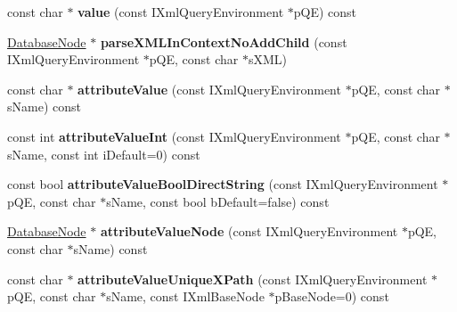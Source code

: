 \begin{DoxyCompactItemize}
\item 
\hypertarget{classgeneral__server_1_1DatabaseNode_a3c3f7f987e9130b0615c0a8320ac7bc9}{const char $\ast$ {\bfseries value} (const \-I\-Xml\-Query\-Environment $\ast$p\-Q\-E) const }\label{classgeneral__server_1_1DatabaseNode_a3c3f7f987e9130b0615c0a8320ac7bc9}

\item 
\hypertarget{classgeneral__server_1_1DatabaseNode_a30fb4e2c3d26b2a14b2abafe7385e47a}{\hyperlink{classgeneral__server_1_1DatabaseNode}{\-Database\-Node} $\ast$ {\bfseries parse\-X\-M\-L\-In\-Context\-No\-Add\-Child} (const \-I\-Xml\-Query\-Environment $\ast$p\-Q\-E, const char $\ast$s\-X\-M\-L)}\label{classgeneral__server_1_1DatabaseNode_a30fb4e2c3d26b2a14b2abafe7385e47a}

\item 
\hypertarget{classgeneral__server_1_1DatabaseNode_a1b46ea1604cb442d056ca617d86dd1e5}{const char $\ast$ {\bfseries attribute\-Value} (const \-I\-Xml\-Query\-Environment $\ast$p\-Q\-E, const char $\ast$s\-Name) const }\label{classgeneral__server_1_1DatabaseNode_a1b46ea1604cb442d056ca617d86dd1e5}

\item 
\hypertarget{classgeneral__server_1_1DatabaseNode_a3ec5946782e737674a8a7c35eb1fa346}{const int {\bfseries attribute\-Value\-Int} (const \-I\-Xml\-Query\-Environment $\ast$p\-Q\-E, const char $\ast$s\-Name, const int i\-Default=0) const }\label{classgeneral__server_1_1DatabaseNode_a3ec5946782e737674a8a7c35eb1fa346}

\item 
\hypertarget{classgeneral__server_1_1DatabaseNode_ae31fd4e2c4018246089fd92495f7d436}{const bool {\bfseries attribute\-Value\-Bool\-Direct\-String} (const \-I\-Xml\-Query\-Environment $\ast$p\-Q\-E, const char $\ast$s\-Name, const bool b\-Default=false) const }\label{classgeneral__server_1_1DatabaseNode_ae31fd4e2c4018246089fd92495f7d436}

\item 
\hypertarget{classgeneral__server_1_1DatabaseNode_ac360b824df46d788a42cd0848e8804c7}{\hyperlink{classgeneral__server_1_1DatabaseNode}{\-Database\-Node} $\ast$ {\bfseries attribute\-Value\-Node} (const \-I\-Xml\-Query\-Environment $\ast$p\-Q\-E, const char $\ast$s\-Name) const }\label{classgeneral__server_1_1DatabaseNode_ac360b824df46d788a42cd0848e8804c7}

\item 
\hypertarget{classgeneral__server_1_1DatabaseNode_a25cd6be4687d185b06d16a990200a0b3}{const char $\ast$ {\bfseries attribute\-Value\-Unique\-X\-Path} (const \-I\-Xml\-Query\-Environment $\ast$p\-Q\-E, const char $\ast$s\-Name, const \-I\-Xml\-Base\-Node $\ast$p\-Base\-Node=0) const }\label{classgeneral__server_1_1DatabaseNode_a25cd6be4687d185b06d16a990200a0b3}


\end{DoxyCompactItemize}
